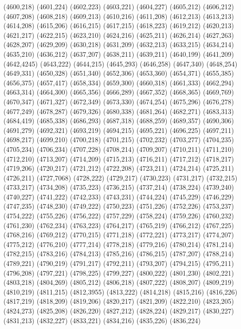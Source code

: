 (4600,218)
(4601,224)
(4602,223)
(4603,221)
(4604,227)
(4605,212)
(4606,212)
(4607,208)
(4608,218)
(4609,213)
(4610,216)
(4611,208)
(4612,213)
(4613,213)
(4614,208)
(4615,206)
(4616,215)
(4617,215)
(4618,223)
(4619,212)
(4620,213)
(4621,217)
(4622,215)
(4623,210)
(4624,216)
(4625,211)
(4626,214)
(4627,263)
(4628,207)
(4629,209)
(4630,218)
(4631,209)
(4632,213)
(4633,215)
(4634,214)
(4635,210)
(4636,212)
(4637,207)
(4638,211)
(4639,211)
(4640,199)
(4641,209)
(4642,4245)
(4643,222)
(4644,215)
(4645,293)
(4646,258)
(4647,340)
(4648,254)
(4649,331)
(4650,328)
(4651,340)
(4652,306)
(4653,360)
(4654,371)
(4655,385)
(4656,375)
(4657,417)
(4658,334)
(4659,300)
(4660,318)
(4661,333)
(4662,294)
(4663,314)
(4664,300)
(4665,356)
(4666,289)
(4667,352)
(4668,365)
(4669,769)
(4670,347)
(4671,327)
(4672,349)
(4673,330)
(4674,254)
(4675,296)
(4676,278)
(4677,249)
(4678,287)
(4679,326)
(4680,338)
(4681,264)
(4682,271)
(4683,313)
(4684,419)
(4685,338)
(4686,293)
(4687,318)
(4688,259)
(4689,357)
(4690,306)
(4691,279)
(4692,321)
(4693,219)
(4694,215)
(4695,221)
(4696,225)
(4697,211)
(4698,217)
(4699,210)
(4700,218)
(4701,215)
(4702,232)
(4703,277)
(4704,235)
(4705,234)
(4706,234)
(4707,228)
(4708,214)
(4709,207)
(4710,211)
(4711,210)
(4712,210)
(4713,207)
(4714,209)
(4715,213)
(4716,211)
(4717,212)
(4718,217)
(4719,206)
(4720,217)
(4721,212)
(4722,208)
(4723,211)
(4724,214)
(4725,211)
(4726,211)
(4727,7068)
(4728,222)
(4729,217)
(4730,223)
(4731,217)
(4732,215)
(4733,217)
(4734,208)
(4735,223)
(4736,215)
(4737,214)
(4738,224)
(4739,240)
(4740,227)
(4741,222)
(4742,233)
(4743,231)
(4744,224)
(4745,229)
(4746,229)
(4747,235)
(4748,230)
(4749,222)
(4750,223)
(4751,226)
(4752,226)
(4753,237)
(4754,222)
(4755,226)
(4756,222)
(4757,229)
(4758,224)
(4759,226)
(4760,232)
(4761,230)
(4762,234)
(4763,223)
(4764,217)
(4765,219)
(4766,212)
(4767,225)
(4768,216)
(4769,212)
(4770,215)
(4771,218)
(4772,221)
(4773,217)
(4774,207)
(4775,212)
(4776,210)
(4777,214)
(4778,218)
(4779,216)
(4780,214)
(4781,214)
(4782,215)
(4783,216)
(4784,213)
(4785,216)
(4786,215)
(4787,207)
(4788,214)
(4789,221)
(4790,219)
(4791,217)
(4792,211)
(4793,207)
(4794,215)
(4795,211)
(4796,208)
(4797,221)
(4798,225)
(4799,227)
(4800,222)
(4801,230)
(4802,221)
(4803,218)
(4804,269)
(4805,212)
(4806,218)
(4807,222)
(4808,207)
(4809,219)
(4810,219)
(4811,215)
(4812,3955)
(4813,222)
(4814,218)
(4815,216)
(4816,226)
(4817,219)
(4818,209)
(4819,206)
(4820,217)
(4821,209)
(4822,210)
(4823,205)
(4824,273)
(4825,208)
(4826,220)
(4827,212)
(4828,224)
(4829,217)
(4830,227)
(4831,213)
(4832,227)
(4833,221)
(4834,216)
(4835,226)
(4836,224)
